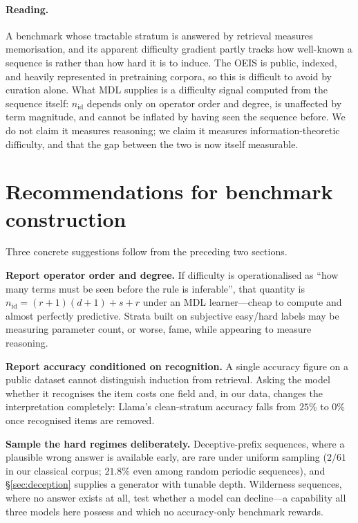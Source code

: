 \documentclass[10pt]{article}
\theoremstyle{definition}
\theoremstyle{plain}
\newcommand{\nid}{n_{\mathrm{id}}}
\begin{document}
\paragraph{Reading.} A benchmark whose tractable stratum is answered by
retrieval measures memorisation, and its apparent difficulty gradient partly
tracks how well-known a sequence is rather than how hard it is to induce. The
OEIS is public, indexed, and heavily represented in pretraining corpora, so
this is difficult to avoid by curation alone. What MDL supplies is a difficulty
signal computed from the sequence itself: $\nid$ depends only on operator order
and degree, is unaffected by term magnitude, and cannot be inflated by having
seen the sequence before. We do not claim it measures reasoning; we claim it
measures information-theoretic difficulty, and that the gap between the two is
now itself measurable.

\section{Recommendations for benchmark construction}
\label{sec:implications}

Three concrete suggestions follow from the preceding two sections.

\textbf{Report operator order and degree.} If difficulty is operationalised as
``how many terms must be seen before the rule is inferable'', that quantity is
$\nid = (r{+}1)(d{+}1) + s + r$ under an MDL learner---cheap to compute and
almost perfectly predictive. Strata built on subjective easy/hard labels may be
measuring parameter count, or worse, fame, while appearing to measure reasoning.

\textbf{Report accuracy conditioned on recognition.} A single accuracy figure on
a public dataset cannot distinguish induction from retrieval. Asking the model
whether it recognises the item costs one field and, in our data, changes the
interpretation completely: Llama's clean-stratum accuracy falls from $25\%$ to
$0\%$ once recognised items are removed.

\textbf{Sample the hard regimes deliberately.} Deceptive-prefix sequences, where
a plausible wrong answer is available early, are rare under uniform sampling
($2/61$ in our classical corpus; $21.8\%$ even among random periodic
sequences), and \S\ref{sec:deception} supplies a generator with tunable depth.
Wilderness sequences, where no answer exists at all, test whether a model can
decline---a capability all three models here possess and which no
accuracy-only benchmark rewards.
\end{document}

